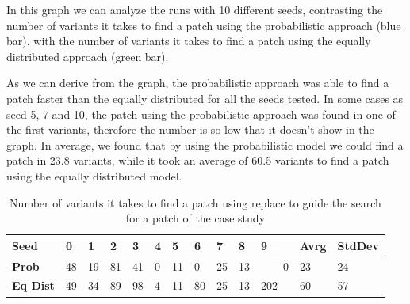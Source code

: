 \documentclass[conference]{IEEEtran}
\begin{document}
{In this graph we can analyze the runs with 10 different seeds, contrasting the 
number of variants it takes to find a patch using the probabilistic approach 
(blue bar), with the number of variants it takes to find a patch using the 
equally distributed approach (green bar). 

As we can derive from the graph, the probabilistic approach was able to find a 
patch faster than the equally distributed for all the seeds tested. In some 
cases as seed 5, 7 and 10, the patch using the probabilistic approach was found 
in one of the first variants, therefore the number is so low that it doesn't 
show in the graph. In average, we found that by using the probabilistic model we 
could find a patch in 23.8 variants, while it took an average of 60.5 variants 
to find a patch using the equally distributed model.

\begin{table}[ht]
\begin{tabular}{lR{0.1cm}R{0.1cm}R{0.1cm}R{0.1cm}R{0.1cm}R{0.1cm}R{0.1cm}R{0.1cm}R{0.1cm}R{0.1cm}R{0.5cm}R{0.5cm}}
\hline
\textbf{Seed} & \textbf{0} & \textbf{1} & \textbf{2} & \textbf{3} & \textbf{4} & \textbf{5} & \textbf{6} & \textbf{7} & \textbf{8} & \textbf{9} & Avrg & StdDev  \\
\hline
\textbf{Prob} & 48 & 19 & 81 & 41 & 0 & 11 & 0 & 25 & 13 & ~~~~0 & 23 & 24 \\

\textbf{Eq Dist} & 49 & 34 & 89 & 98 & 4 & 11 & 80 & 25 & 13 & 202 & 60 & 57\\
\hline
\end{tabular}
%
\center
  \caption{Number of variants it takes to find a patch using replace to guide the search for a patch of the case study}
  \label{fig:resultsReplace}
\end{table} 


}
\end{document}
